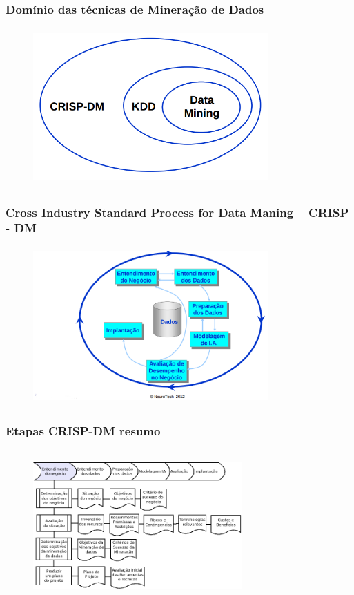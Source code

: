 \documentclass[11pt]{beamer}
\begin{document}
\begin{frame}\frametitle{ Domínio das técnicas de Mineração de Dados}
	\transdissolve[duration=2, direction=25]
	\begin{figure}[!ht]
		\includegraphics[width=90mm, height=60mm]{Figuras/BigData/RelacaoCrispKddDm.png}
	\end{figure}
\end{frame}


\begin{frame}\frametitle{ Cross Industry Standard Process for Data Maning -- CRISP - DM}
	\transboxout[duration=2, direction=25]
	\begin{figure}[!ht]
		\includegraphics[width=90mm, height=60mm]{Figuras/BigData/CrispDM.png}
	\end{figure}
\end{frame}


\begin{frame}\frametitle{ Etapas CRISP-DM resumo}
	\transdissolve[duration=1, direction=25]
	\begin{figure}[!ht]
		\includegraphics[width=80mm, height=58mm]{Figuras/Crisp/Entendimento.png}
	\end{figure}
\end{frame}
\end{document}
